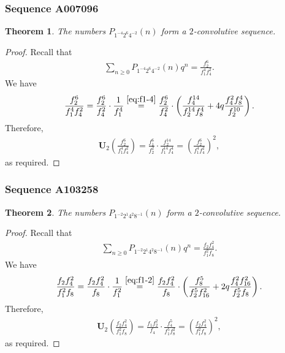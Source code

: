 \documentclass[12pt,reqno]{amsart}
\numberwithin{equation}{section}
\theoremstyle{plain}
\newtheorem{theorem}{Theorem}[section]
\theoremstyle{definition}
\theoremstyle{named}
\newcommand{\UU}{\mathbf{U}}
\begin{document}
\subsubsection{Sequence A007096}

\begin{theorem}\label{th:A007096}
	The numbers $P_{1^{-4} 2^6 4^{-2}}(n)$ form a $2$-convolutive sequence.
\end{theorem}

\begin{proof}
	Recall that
	\begin{align*}
		\sum_{n\ge 0} P_{1^{-4} 2^6 4^{-2}}(n) q^n = \frac{f_2^6}{f_1^4 f_4^2}.
	\end{align*}
	We have
	\begin{align*}
		\frac{f_2^6}{f_1^4 f_4^2} = \frac{f_2^6}{f_4^2}\cdot \frac{1}{f_1^4} \overset{\eqref{eq:f1-4}}{=} \frac{f_2^6}{f_4^2}\cdot \left(\frac{f_4^{14}}{f_2^{14}f_8^4}+4q\frac{f_4^2f_8^4}{f_2^{10}}\right).
	\end{align*}
	Therefore,
	\begin{align*}
		\UU_2\left(\frac{f_2^6}{f_1^4 f_4^2}\right) = \frac{f_1^6}{f_2^2}\cdot \frac{f_2^{14}}{f_1^{14}f_4^4} = \left(\frac{f_2^6}{f_1^4 f_4^2}\right)^2,
	\end{align*}
	as required.
\end{proof}

\subsubsection{Sequence A103258}

\begin{theorem}\label{th:A103258}
	The numbers $P_{1^{-2} 2^1 4^{2} 8^{-1}}(n)$ form a $2$-convolutive sequence.
\end{theorem}

\begin{proof}
	Recall that
	\begin{align*}
		\sum_{n\ge 0} P_{1^{-2} 2^1 4^{2} 8^{-1}}(n) q^n = \frac{f_2 f_4^2}{f_1^2 f_8}.
	\end{align*}
	We have
	\begin{align*}
		\frac{f_2 f_4^2}{f_1^2 f_8} = \frac{f_2 f_4^2}{f_8}\cdot \frac{1}{f_1^2} \overset{\eqref{eq:f1-2}}{=} \frac{f_2 f_4^2}{f_8}\cdot \left(\frac{f_8^5}{f_2^5f_{16}^2}+2q\frac{f_4^2f_{16}^2}{f_2^5f_8}\right).
	\end{align*}
	Therefore,
	\begin{align*}
		\UU_2\left(\frac{f_2 f_4^2}{f_1^2 f_8}\right) = \frac{f_1 f_2^2}{f_4}\cdot \frac{f_4^5}{f_1^5f_{8}^2} = \left(\frac{f_2 f_4^2}{f_1^2 f_8}\right)^2,
	\end{align*}
	as required.
\end{proof}
\end{document}

